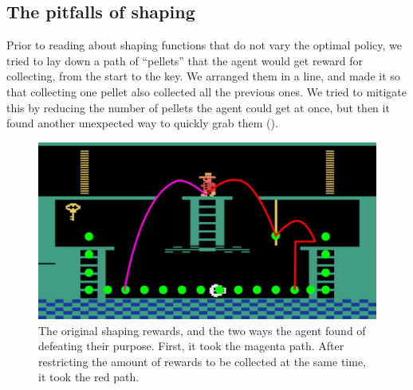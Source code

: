 \subsection{The pitfalls of shaping\label{subsec:evaluation-shaping}}
Prior to reading about shaping functions that do not vary the optimal policy, we
tried to lay down a path of ``pellets'' that the agent would get reward for
collecting, from the start to the key. We arranged them in a line, and made it
so that collecting one pellet also collected all the previous ones. We tried to
mitigate this by reducing the number of pellets the agent could get at once, but
then it found another unexpected way to quickly grab them
().

\begin{figure}[hbtp]
\begin{center}
\includegraphics[width=\textwidth / 5 * 3]{img/shaping-defeated.pdf}
\end{center}
\caption{The original shaping rewards, and the two ways the agent found of
  defeating their purpose. First, it took the magenta path. After restricting
  the amount of rewards to be collected at the same time, it took the red
path.\label{fig:shaping-pitfalls}}
\end{figure}


